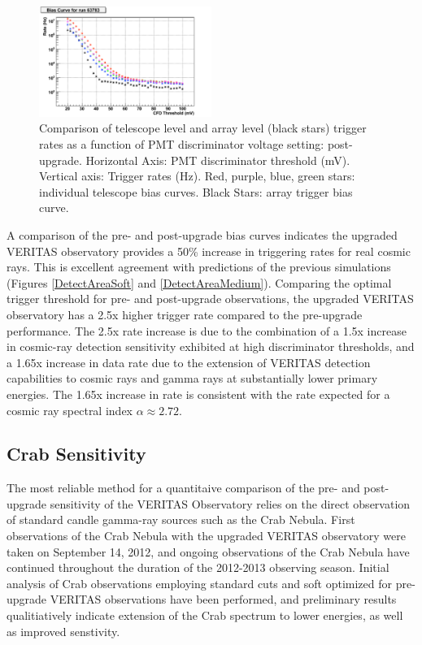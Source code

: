 \documentclass[a4paper]{article}
\begin{document}
\begin{figure}[tbp]
  \centering
  \includegraphics[width=0.5\textwidth]{icrc2013-08}
   \caption{Comparison of telescope level and array level (black stars) trigger rates as a function of PMT discriminator voltage setting: post-upgrade. Horizontal Axis: PMT discriminator threshold (mV). Vertical axis: Trigger rates (Hz). Red, purple, blue, green stars: individual telescope bias curves. Black Stars: array trigger bias curve.}
  \label{BiasCurve2012}
 \end{figure}

 A comparison of the pre- and post-upgrade bias curves indicates the upgraded VERITAS observatory provides  a 50\% increase in triggering rates for real cosmic rays. This is excellent agreement with predictions of  the previous simulations (Figures \ref{DetectAreaSoft} and \ref{DetectAreaMedium}). Comparing the optimal trigger threshold for pre- and post-upgrade observations, the upgraded VERITAS observatory has a 2.5x higher trigger rate compared to the pre-upgrade performance.  The 2.5x rate increase is due to the combination of a 1.5x increase in cosmic-ray detection sensitivity exhibited at high discriminator thresholds, and a 1.65x increase in data rate  due to the extension of VERITAS detection capabilities to cosmic rays and gamma rays at substantially lower primary energies. The 1.65x increase in rate is consistent with the rate expected for a cosmic ray spectral index $\alpha \approx 2.72$.
 
 \subsection{Crab Sensitivity}
The most reliable method for a quantitaive comparison of the  pre- and post-upgrade sensitivity of the VERITAS Observatory relies on the direct observation of standard candle gamma-ray sources such as the Crab Nebula.  First observations of the Crab Nebula with the upgraded VERITAS observatory were taken on September 14, 2012, and ongoing observations of the Crab Nebula have continued throughout the duration of the 2012-2013 observing season. 
Initial  analysis of Crab observations employing standard cuts and soft optimized for pre-upgrade VERITAS observations have been performed, and preliminary results qualitiatively indicate extension of the Crab spectrum to lower energies, as well as improved senstivity. 
\end{document}
